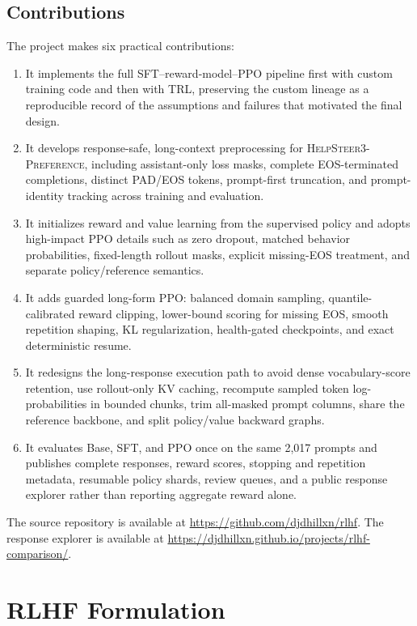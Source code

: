 \documentclass[11pt]{article}
\newcommand{\dataset}{\textsc{HelpSteer3-Preference}}
\newcommand{\trl}{\textsc{TRL}}
\newcommand{\projecturl}{\url{https://github.com/djdhillxn/rlhf}}
\newcommand{\explorerurl}{\url{https://djdhillxn.github.io/projects/rlhf-comparison/}}
\begin{document}
\subsection{Contributions}

The project makes six practical contributions:

\begin{enumerate}
  \item It implements the full SFT--reward-model--PPO pipeline first with
  custom training code and then with \trl{}, preserving the custom lineage as
  a reproducible record of the assumptions and failures that motivated the
  final design.
  \item It develops response-safe, long-context preprocessing for
  \dataset{}, including assistant-only loss masks, complete EOS-terminated
  completions, distinct PAD/EOS tokens, prompt-first truncation, and
  prompt-identity tracking across training and evaluation.
  \item It initializes reward and value learning from the supervised policy
  and adopts high-impact PPO details such as zero dropout, matched behavior
  probabilities, fixed-length rollout masks, explicit missing-EOS treatment,
  and separate policy/reference semantics.
  \item It adds guarded long-form PPO: balanced domain sampling,
  quantile-calibrated reward clipping, lower-bound scoring for missing EOS,
  smooth repetition shaping, KL regularization, health-gated checkpoints, and
  exact deterministic resume.
  \item It redesigns the long-response execution path to avoid dense
  vocabulary-score retention, use rollout-only KV caching, recompute sampled
  token log-probabilities in bounded chunks, trim all-masked prompt columns,
  share the reference backbone, and split policy/value backward graphs.
  \item It evaluates Base, SFT, and PPO once on the same 2,017 prompts and
  publishes complete responses, reward scores, stopping and repetition
  metadata, resumable policy shards, review queues, and a public response
  explorer rather than reporting aggregate reward alone.
\end{enumerate}

The source repository is available at \projecturl{}. The response explorer is
available at \explorerurl{}.

\section{RLHF Formulation}
\end{document}
